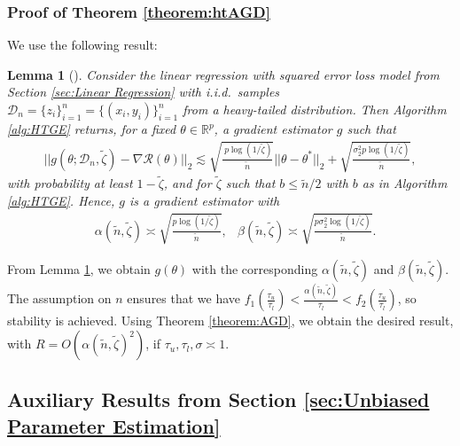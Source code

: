 \documentclass{article}
\newtheorem{lemma}{Lemma}
\begin{document}

\subsubsection{Proof of Theorem \ref{theorem:htAGD}}
\label{AppThmHTAGD}

We use the following result:
\begin{lemma}[\cite{RE}]
\label{lemma:geglmht}
Consider the linear regression with squared error loss model from Section \ref{sec:Linear Regression} with i.i.d.\ samples $\mathcal{D}_n = \{z_i\}_{i = 1}^n = \{(x_i, y_i)\}_{i = 1}^n$ from a heavy-tailed distribution. Then Algorithm \ref{alg:HTGE} returns, for a fixed $\theta \in \mathbb{R}^p$, a gradient estimator $g$ such that
\begin{align*}
||g(\theta; \mathcal{D}_n, \widetilde{\zeta}) - \nabla\mathcal{R}(\theta)||_2 \lesssim \sqrt{\frac{\ p \log(1/\widetilde{\zeta})}{\widetilde{n}}}||\theta - \theta^*||_2 + \sqrt{\frac{\sigma_2^2 p \log(1/\widetilde{\zeta})}{\widetilde{n}}},
\end{align*}
with probability at least $1 - \widetilde{\zeta}$, and for $\widetilde{\zeta}$ such that $b \leq \widetilde{n}/2$ with $b$ as in Algorithm \ref{alg:HTGE}. Hence, $g$ is a gradient estimator with
\begin{align*}
&\alpha(\widetilde{n}, \widetilde{\zeta}) \asymp \sqrt{\frac{p \log(1/\widetilde{\zeta})}{\widetilde{n}}},
&\beta(\widetilde{n}, \widetilde{\zeta}) \asymp \sqrt{\frac{p\sigma_2^2\log(1/\widetilde{\zeta})}{\widetilde{n}}}.
\end{align*}
\end{lemma}

From Lemma \ref{lemma:geglmht}, we obtain $g(\theta)$ with the corresponding $\alpha(\widetilde{n}, \widetilde{\zeta})$ and $\beta(\widetilde{n}, \widetilde{\zeta})$. The assumption on $n$ ensures that we have $f_1\left(\frac{\tau_u}{\tau_l}\right) < \frac{\alpha(\widetilde{n}, \widetilde{\zeta})}{\tau_l} < f_2\left(\frac{\tau_u}{\tau_l}\right)$, so stability is achieved. Using Theorem \ref{theorem:AGD}, we obtain the desired result, with $R = O\left(\alpha(\widetilde{n}, \widetilde{\zeta})^2\right)$, if $\tau_u, \tau_l, \sigma \asymp 1$.


\subsection{Auxiliary Results from Section \ref{sec:Unbiased Parameter Estimation}}
\label{sec:Proofs of the Auxiliary Results_Nester}
\end{document}

